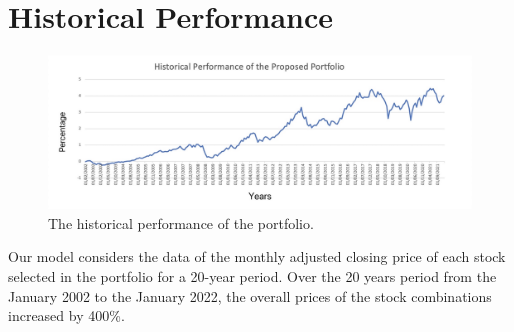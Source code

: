 
\section{Historical Performance}

\begin{figure}[!h]
\centering
\includegraphics[width=1\textwidth]{History.png}
\caption{The historical performance of the portfolio.}
\end{figure}

Our model considers the data of the monthly adjusted closing price of each stock selected in the portfolio for a 20-year period. Over the 20 years period from the January 2002 to the January 2022, the overall prices of the stock combinations increased by 400\%.
\newpage